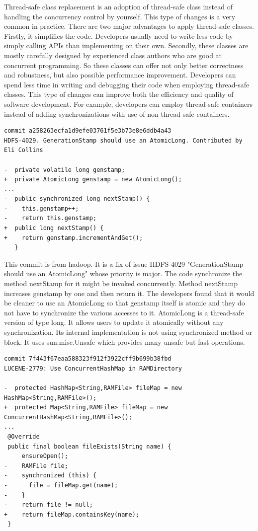 \documentclass[conference]{IEEEtran}
\begin{document}
Thread-safe class replacement is an adoption of thread-safe class instead of handling the concurrency control by yourself. This type of changes is a very common in practice. There are two major advantages to apply thread-safe classes. Firstly, it simplifies the code. Developers usually need to write less code by simply calling APIs than implementing on their own. Secondly, these classes are mostly carefully designed by experienced class authors who are good at concurrent programming. So these classes can offer not only better correctness and robustness, but also possible performance improvement. Developers can spend less time in writing and debugging their code when employing thread-safe classes. This type of changes can improve both the efficiency and quality of software development. For example, developers can employ thread-safe containers instead of adding synchronizations with use of non-thread-safe containers.

\begin{lstlisting}
commit a258263ecfa1d9efe03761f5e3b73e8e6ddb4a43
HDFS-4029. GenerationStamp should use an AtomicLong. Contributed by Eli Collins

-  private volatile long genstamp;
+  private AtomicLong genstamp = new AtomicLong();
...
-  public synchronized long nextStamp() {
-    this.genstamp++;
-    return this.genstamp;
+  public long nextStamp() {
+    return genstamp.incrementAndGet();
   }
\end{lstlisting}

This commit is from hadoop. It is a fix of issue HDFS-4029 "GenerationStamp should use an AtomicLong" whose priority is major. The code synchronize the method nextStamp for it might be invoked concurrently. Method nextStamp increases genstamp by one and then return it. The developers found that it would be cleaner to use an AtomicLong so that genstamp itself is atomic and they do not have to synchronize the various accesses to it. AtomicLong is a thread-safe version of type long. It allows users to update it atomically without any synchronization. Its internal implementation is not using synchronized method or block. It uses sun.misc.Unsafe which provides many unsafe but fast operations.

\begin{lstlisting}
commit 7f443f67eaa588323f912f3922cff9b699b38fbd
LUCENE-2779: Use ConcurrentHashMap in RAMDirectory

-  protected HashMap<String,RAMFile> fileMap = new HashMap<String,RAMFile>();
+  protected Map<String,RAMFile> fileMap = new ConcurrentHashMap<String,RAMFile>();
...
 @Override
 public final boolean fileExists(String name) {
     ensureOpen();
-    RAMFile file;
-    synchronized (this) {
-      file = fileMap.get(name);
-    }
-    return file != null;
+    return fileMap.containsKey(name);
 }
\end{lstlisting}
\end{document}

